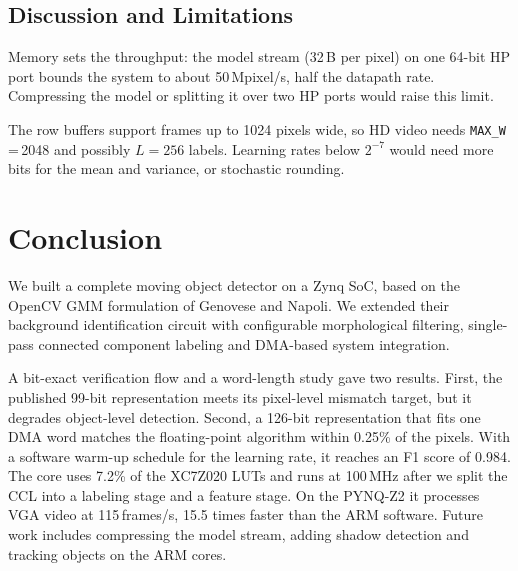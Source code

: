 \documentclass[conference]{IEEEtran}
\begin{document}
\subsection{Discussion and Limitations}
Memory sets the throughput: the model stream (32\,B per pixel) on one 64-bit HP
port bounds the system to about 50\,Mpixel/s, half the datapath rate.
Compressing the model or splitting it over two HP ports would raise this limit.

The row buffers support frames up to 1024 pixels wide, so HD video needs
\texttt{MAX\_W}\,=\,2048 and possibly $L=256$ labels. Learning rates below
$2^{-7}$ would need more bits for the mean and variance, or stochastic rounding.

\section{Conclusion}
We built a complete moving object detector on a Zynq SoC, based on the
OpenCV GMM formulation of Genovese and Napoli. We extended their background
identification circuit with configurable morphological filtering, single-pass
connected component labeling and DMA-based system integration.

A bit-exact verification flow and a word-length study gave two results. First,
the published 99-bit representation meets its pixel-level mismatch target, but it
degrades object-level detection. Second, a 126-bit representation that fits one
DMA word matches the floating-point algorithm within 0.25\% of the pixels. With
a software warm-up schedule for the learning rate, it reaches an F1 score of
0.984. The core uses 7.2\% of the XC7Z020 LUTs and runs at 100\,MHz after we
split the CCL into a labeling stage and a feature stage. On the PYNQ-Z2 it
processes VGA video at 115\,frames/s, 15.5 times faster than the ARM software.
Future work includes
compressing the model stream, adding shadow detection and tracking objects on the
ARM cores.
\end{document}
